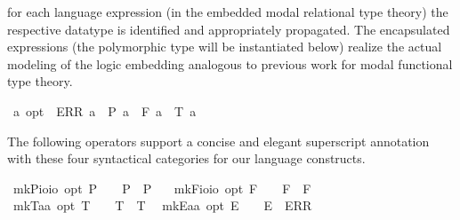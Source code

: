 \begin{isabellebody}
\begin{isamarkuptext}
 for each language expression (in the embedded modal relational type theory) the respective datatype 
 is identified and appropriately propagated. The encapsulated expressions (the polymorphic type  
 will be instantiated below) realize the actual modeling of the logic embedding analogous 
 to previous work for modal functional type theory.%
\end{isamarkuptext}%
\isamarkuptrue%
\isamarkupfalse%
\ {\isacharprime}a\ opt\ {\isacharequal}\ ERR\ {\isacharprime}a\ {\isacharbar}\ P\ {\isacharprime}a\ {\isacharbar}\ F\ {\isacharprime}a\ {\isacharbar}\ T\ {\isacharprime}a%
\begin{isamarkuptext}%
The following operators support a concise and elegant superscript annotation with these
 four syntactical categories for our language constructs.%
\end{isamarkuptext}%
\isamarkuptrue%
\isamarkupfalse%
\ mkP{\isacharcolon}{\isacharcolon}{\isachardoublequoteopen}io{\isasymRightarrow}io\ opt{\isachardoublequoteclose}\ {\isacharparenleft}{\isachardoublequoteopen}{\isacharunderscore}\isactrlsup P{\isachardoublequoteclose}\ {}{}{}{\isacharparenright}\ \ \ {\isachardoublequoteopen}{\isasymphi}\isactrlsup P\ {\isasymequiv}\ P\ {\isasymphi}{\isachardoublequoteclose}\ \isanewline
{}\isamarkupfalse%
\ mkF{\isacharcolon}{\isacharcolon}{\isachardoublequoteopen}io{\isasymRightarrow}io\ opt{\isachardoublequoteclose}\ {\isacharparenleft}{\isachardoublequoteopen}{\isacharunderscore}\isactrlsup F{\isachardoublequoteclose}\ {}{}{}{\isacharparenright}\ \ \ {\isachardoublequoteopen}{\isasymphi}\isactrlsup F\ {\isasymequiv}\ F\ {\isasymphi}{\isachardoublequoteclose}\ \isanewline
{}\isamarkupfalse%
\ mkT{\isacharcolon}{\isacharcolon}{\isachardoublequoteopen}{\isacharprime}a{\isasymRightarrow}{\isacharprime}a\ opt{\isachardoublequoteclose}\ {\isacharparenleft}{\isachardoublequoteopen}{\isacharunderscore}\isactrlsup T{\isachardoublequoteclose}\ {}{}{}{\isacharparenright}\ \ \ {\isachardoublequoteopen}{\isasymphi}\isactrlsup T\ {\isasymequiv}\ T\ {\isasymphi}{\isachardoublequoteclose}\isanewline
{}\isamarkupfalse%
\ mkE{\isacharcolon}{\isacharcolon}{\isachardoublequoteopen}{\isacharprime}a{\isasymRightarrow}{\isacharprime}a\ opt{\isachardoublequoteclose}\ {\isacharparenleft}{\isachardoublequoteopen}{\isacharunderscore}\isactrlsup E{\isachardoublequoteclose}\ {}{}{}{\isacharparenright}\ \ \ {\isachardoublequoteopen}{\isasymphi}\isactrlsup E\ {\isasymequiv}\ ERR\ {\isasymphi}{\isachardoublequoteclose}%

\end{isabellebody}

